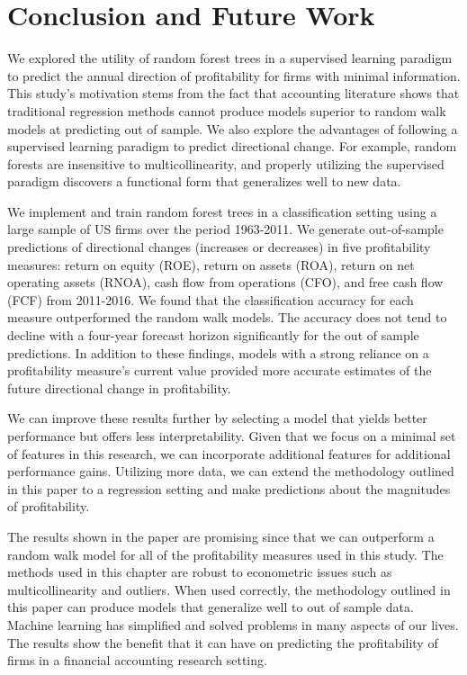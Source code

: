 \section{Conclusion and Future Work}

We explored the utility of random forest trees in a supervised learning paradigm to predict the annual direction of profitability for firms with minimal information. This study's motivation stems from the fact that accounting literature shows that traditional regression methods cannot produce models superior to random walk models at predicting out of sample. We also explore the advantages of following a supervised learning paradigm to predict directional change. For example, random forests are insensitive to multicollinearity, and properly utilizing the supervised paradigm discovers a functional form that generalizes well to new data.

We implement and train random forest trees in a classification setting using a large sample of US firms over the period 1963-2011.  We generate out-of-sample predictions of directional changes (increases or decreases) in five profitability measures: return on equity (ROE), return on assets (ROA), return on net operating assets (RNOA), cash flow from operations (CFO), and free cash flow (FCF) from 2011-2016. We found that the classification accuracy for each measure outperformed the random walk models.  The accuracy does not tend to decline with a four-year forecast horizon significantly for the out of sample predictions. In addition to these findings, models with a strong reliance on a profitability measure's current value provided more accurate estimates of the future directional change in profitability.  

We can improve these results further by selecting a model that yields better performance but offers less interpretability. Given that we focus on a minimal set of features in this research, we can incorporate additional features for additional performance gains. Utilizing more data, we can extend the methodology outlined in this paper to a regression setting and make predictions about the magnitudes of profitability. 


The results shown in the paper are promising since that we can outperform a random walk model for all of the profitability measures used in this study. The methods used in this chapter are robust to econometric issues such as multicollinearity and outliers.  When used correctly, the methodology outlined in this paper can produce models that generalize well to out of sample data.  Machine learning has simplified and solved problems in many aspects of our lives.  The results show the benefit that it can have on predicting the profitability of firms in a financial accounting research setting.


